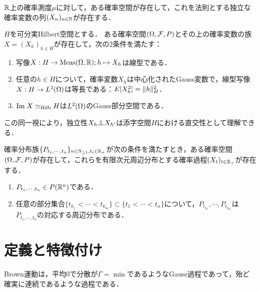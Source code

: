 \documentclass[uplatex,dvipdfmx]{jsreport}
\begin{document}
\begin{corollary}
    $\mathbb{R}$上の確率測度$\mu$に対して，ある確率空間が存在して，これを法則とする独立な確率変数の列$(X_n)_{n\in\mathbb{N}}$が存在する．
\end{corollary}

\begin{corollary}[Hilbert空間により添字付けられた確率過程]
    $H$を可分実Hilbert空間とする．
    ある確率空間$(\Omega,\mathcal{F},P)$とその上の確率変数の族$X=(X_h)_{h\in H}$が存在して，次の2条件を満たす：
    \begin{enumerate}
        \item 写像$X:H\to\mathrm{Meas}(\Omega,\mathbb{R});h\mapsto X_h$は線型である．
        \item 任意の$h\in H$について，確率変数$X_h$は中心化されたGauss変数で，線型写像$X:H\to L^2(\Omega)$は等長である：$E[X_h^2]=\|h\|^2_H$．
        \item $\mathrm{Im}\; X\simeq_{\mathrm{Hilb}} H$は$L^2(\Omega)$のGauss部分空間である．
    \end{enumerate}
\end{corollary}
\begin{remark}
    この同一視により，独立性$X_h\indep X_{h'}$は添字空間$H$における直交性として理解できる．
\end{remark}

\begin{theorem}[確率過程版]\label{thm-Kolmogorov-extension-theorem}
    確率分布族$\{P_{t_1,\cdots,t_n}\}_{n\in\mathbb{N}_{\ge1},t_i\in\mathbb{R}_+}$が次の条件を満たすとき，ある確率空間$(\Omega,\mathcal{F},P)$が存在して，これらを有限次元周辺分布とする確率過程$(X_t)_{t\in\mathbb{R}_+}$が存在する．
    \begin{enumerate}[({C}1)]
        \item $P_{t_1,\cdots,t_n}\in P(\mathbb{R}^n)$である．
        \item 任意の部分集合$\{t_{k_1}<\cdots<t_{k_m}\}\subset\{t_1<\cdots<t_n\}$について，$P_{t_{k_1}},\cdots,P_{t_{k_m}}$は$P_{t_1,\cdots,t_n}$の対応する周辺分布である．
    \end{enumerate}
\end{theorem}

\section{定義と特徴付け}

\begin{tcolorbox}[colframe=ForestGreen, colback=ForestGreen!10!white,breakable,colbacktitle=ForestGreen!40!white,coltitle=black,fonttitle=\bfseries\sffamily,
title=]
    Brown運動は，平均$0$で分散が$\Gamma=\min$であるようなGauss過程であって，殆ど確実に連続であるような過程である．
\end{tcolorbox}
\end{document}
